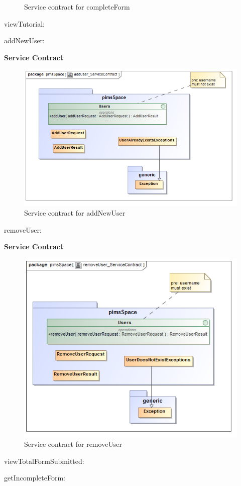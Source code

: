 \begin{description}
\begin{description}
\begin{figure}[H]
			\caption{Service contract for completeForm}
		\end{figure}
	\end{description} 
	\item{viewTutorial:}
	\item{addNewUser:}
			\begin{description}
		\item{\textbf{Service Contract}}
		\begin{figure}[H]
			\centerline{\includegraphics[width=0.7\linewidth]{./Graphics/pimsSpace/addUser_ServiceContract}}
			\caption{Service contract for addNewUser}
		\end{figure}
	\end{description} 
	\item{removeUser:}
			\begin{description}
		\item{\textbf{Service Contract}}
		\begin{figure}[H]
			\centerline{\includegraphics[width=0.7\linewidth]{./Graphics/pimsSpace/removeUser_ServiceContract}}
			\caption{Service contract for removeUser}
		\end{figure}
	\end{description} 
	\item{viewTotalFormSubmitted:} 
	\item{getIncompleteForm:}
\end{description}
